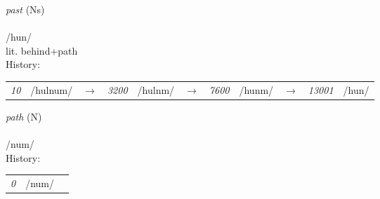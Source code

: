 \vspace{15pt}
\begin{nopagebreak}
 \textit{past} (Ns)\\
\\
\noindent /h{\textprimstress}un/\\
\noindent lit. behind+path\\


\noindent History:

\vspace{-0pt}
\hspace{40pt}
\begin{tabular}{ccc}
\textit{10} & /hulnum/&$\rightarrow$ & \textit{3200} & /hulnm/&$\rightarrow$ & \textit{7600} & /hunm/&$\rightarrow$ & \textit{13001} & /hun/& \\
\end{tabular}

\vspace{20pt}\hline

\end{nopagebreak}
\filbreak



\vspace{15pt}
\begin{nopagebreak}
 \textit{path} (N)\\
\\
\noindent /n{\textprimstress}um/\\


\noindent History:

\vspace{-0pt}
\hspace{40pt}
\begin{tabular}{ccc}
\textit{0} & /num/& \\
\end{tabular}

\vspace{20pt}\hline

\end{nopagebreak}
\filbreak



